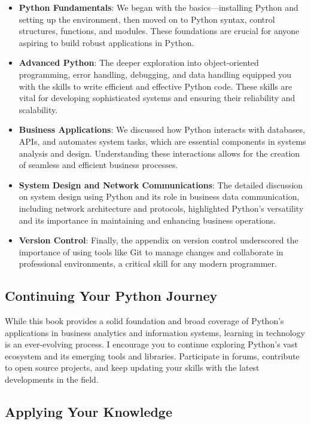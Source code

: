 \documentclass[
  letterpaper,
  DIV=11,
  numbers=noendperiod]{scrreprt}
\begin{document}
\begin{itemize}
\item
  \textbf{Python Fundamentals}: We began with the basics---installing
  Python and setting up the environment, then moved on to Python syntax,
  control structures, functions, and modules. These foundations are
  crucial for anyone aspiring to build robust applications in Python.
\item
  \textbf{Advanced Python}: The deeper exploration into object-oriented
  programming, error handling, debugging, and data handling equipped you
  with the skills to write efficient and effective Python code. These
  skills are vital for developing sophisticated systems and ensuring
  their reliability and scalability.
\item
  \textbf{Business Applications}: We discussed how Python interacts with
  databases, APIs, and automates system tasks, which are essential
  components in systems analysis and design. Understanding these
  interactions allows for the creation of seamless and efficient
  business processes.
\item
  \textbf{System Design and Network Communications}: The detailed
  discussion on system design using Python and its role in business data
  communication, including network architecture and protocols,
  highlighted Python's versatility and its importance in maintaining and
  enhancing business operations.
\item
  \textbf{Version Control}: Finally, the appendix on version control
  underscored the importance of using tools like Git to manage changes
  and collaborate in professional environments, a critical skill for any
  modern programmer.
\end{itemize}

\subsection{Continuing Your Python
Journey}\label{continuing-your-python-journey}

While this book provides a solid foundation and broad coverage of
Python's applications in business analytics and information systems,
learning in technology is an ever-evolving process. I encourage you to
continue exploring Python's vast ecosystem and its emerging tools and
libraries. Participate in forums, contribute to open source projects,
and keep updating your skills with the latest developments in the field.

\subsection{Applying Your Knowledge}\label{applying-your-knowledge}
\end{document}
